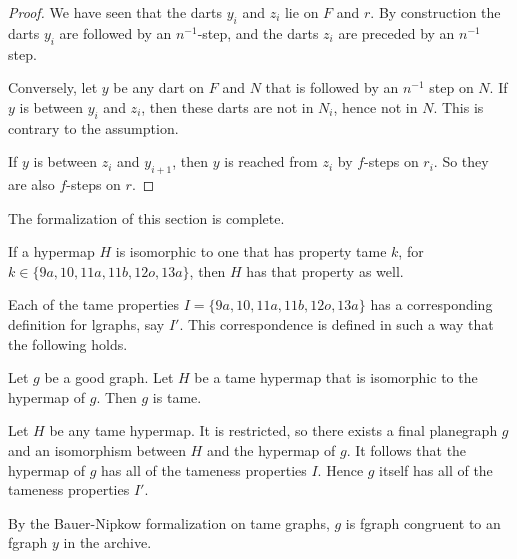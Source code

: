 \begin{proof}  We have seen that the darts $y_i$ and $z_i$ lie on $F$ and $r$.
By construction the darts $y_i$ are followed by an $n^{-1}$-step, and the darts
$z_i$ are preceded by an $n^{-1}$ step.

Conversely, let $y$ be any dart on $F$ and $N$ that is followed by an $n^{-1}$ step on $N$.
If $y$ is between $y_i$ and $z_i$, then these darts are not in $N_i$, hence not in $N$.  
This is contrary
to the assumption.

If $y$ is between $z_i$ and $y_{i+1}$, then $y$ is reached from $z_i$ by $f$-steps on $r_i$.
So they are also $f$-steps on $r$.
\end{proof}





The formalization of this section is complete.

\begin{lemma} 
If a hypermap $H$ is isomorphic to one that has property
tame $k$, for $k\in \{9a, 10, 11a, 11b, 12o, 13a\}$, then
$H$ has that property as well.
\end{lemma} 

Each of the tame properties $I=\{9a,10,11a,11b,12o,13a\}$ has
a corresponding definition for lgraphs, say $I'$.  This correspondence is
defined in such a way that the following holds.

\begin{lemma}  Let $g$ be a good graph.  
Let $H$ be a tame hypermap that is isomorphic to the hypermap of $g$.
Then $g$ is tame.
\end{lemma} 

Let $H$ be any tame hypermap.  It is restricted, so there exists
a final planegraph $g$ and an isomorphism between $H$ and the
hypermap of $g$.  It follows that the hypermap of $g$ has all of
the tameness properties $I$.  Hence $g$ itself has all of the tameness
properties $I'$.  

By the Bauer-Nipkow formalization on tame graphs, $g$ is 
fgraph congruent
to an fgraph $y$ in the archive.

